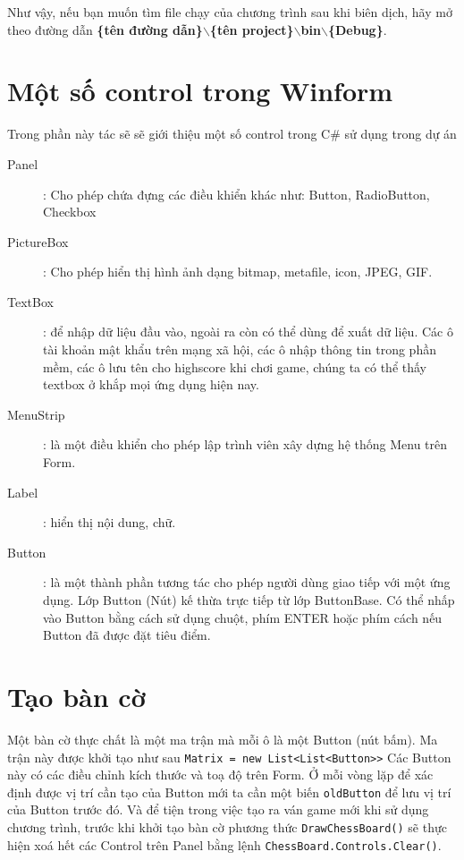 Như vậy, nếu bạn muốn tìm file chạy của chương trình sau khi biên dịch, hãy mở theo đường dẫn \textbf{\{tên đường dẫn\}$\backslash$\{tên project\}$\backslash$bin$\backslash$\{Debug\}}.

\section{Một số control trong Winform}
Trong phần này tác sẽ sẽ giới thiệu một số control trong C\# sử dụng trong dự án
\begin{description}
	\item [Panel]: Cho phép chứa đựng các điều khiển khác như: Button, RadioButton, Checkbox
	\item [PictureBox]: Cho phép hiển thị hình ảnh dạng bitmap, metafile, icon, JPEG, GIF.          
	\item [TextBox]: để nhập dữ liệu đầu vào, ngoài ra còn có thể dùng để xuất dữ liệu. Các ô tài khoản mật khẩu trên mạng xã hội, các ô nhập thông tin trong phần mềm, các ô lưu tên cho highscore khi chơi game, chúng ta có thể thấy textbox ở khắp mọi ứng dụng hiện nay.
	\item [MenuStrip]: là một điều khiển cho phép lập trình viên xây dựng hệ thống Menu trên Form. 
	\item [Label]: hiển thị nội dung, chữ.
	\item [Button]: là một thành phần tương tác cho phép người dùng giao tiếp với một ứng dụng. Lớp Button (Nút) kế thừa trực tiếp từ lớp ButtonBase. Có thể nhấp vào Button bằng cách sử dụng chuột, phím ENTER hoặc phím cách nếu Button đã được đặt tiêu điểm.
\end{description}
\section{Tạo bàn cờ}\label{sec:create-table}
Một bàn cờ thực chất là một ma trận mà mỗi ô là một Button (nút bấm). Ma trận này được khởi tạo như sau \;\texttt{Matrix = new List<List<Button>{}>} Các Button này có các điều chỉnh kích thước và toạ độ trên Form. Ở mỗi vòng lặp để xác định được vị trí cần tạo của Button mới ta cần một biến \texttt{oldButton} để lưu vị trí của Button trước đó. Và để tiện trong việc tạo ra ván game mới khi sử dụng chương trình, trước khi khởi tạo bàn cờ phương thức \texttt{DrawChessBoard()} sẽ thực hiện xoá hết các Control trên Panel bằng lệnh \texttt{ChessBoard.Controls.Clear()}.
\renewcommand{\lstlistingname}{Đoạn mã}%

